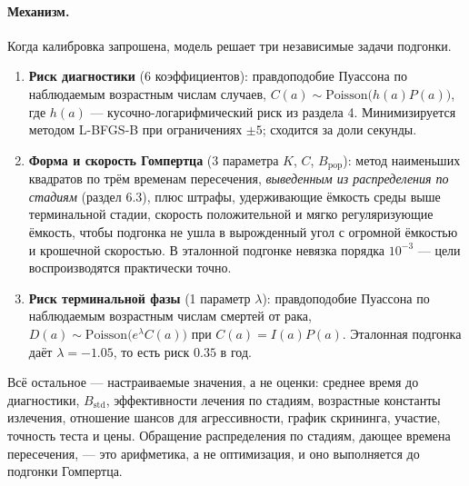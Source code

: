 \documentclass[12pt,a4paper]{article}
\newcommand{\mech}[1]{\paragraph{Механизм.} #1}
\begin{document}
\mech{Когда калибровка запрошена, модель решает три независимые задачи подгонки.

\begin{enumerate}[nosep]
  \item \textbf{Риск диагностики} (6 коэффициентов): правдоподобие Пуассона по наблюдаемым возрастным числам
        случаев, $C(a)\sim\mathrm{Poisson}\bigl(h(a)P(a)\bigr)$, где $h(a)$ --- кусочно-логарифмический риск
        из раздела 4. Минимизируется методом L-BFGS-B при ограничениях
        $\pm5$; сходится за доли секунды.
  \item \textbf{Форма и скорость Гомпертца} (3 параметра $K$, $C$, $B_{\text{pop}}$): метод наименьших
        квадратов по трём временам пересечения, \emph{выведенным из распределения по стадиям} (раздел 6.3),
        плюс штрафы, удерживающие ёмкость среды выше терминальной стадии, скорость положительной и мягко
        регуляризующие ёмкость, чтобы подгонка не ушла в вырожденный угол с огромной ёмкостью и крошечной
        скоростью. В эталонной подгонке невязка порядка $10^{-3}$ --- цели воспроизводятся практически точно.
  \item \textbf{Риск терминальной фазы} (1 параметр $\lambda$): правдоподобие Пуассона по наблюдаемым
        возрастным числам смертей от рака, $D(a)\sim\mathrm{Poisson}\bigl(e^{\lambda}C(a)\bigr)$ при
        $C(a)=I(a)P(a)$. Эталонная подгонка даёт $\lambda=-1.05$, то есть риск $0.35$ в год.
\end{enumerate}

Всё остальное --- настраиваемые значения, а не оценки: среднее время до диагностики, $B_{\text{std}}$,
эффективности лечения по стадиям, возрастные константы излечения, отношение шансов для агрессивности,
график скрининга, участие, точность теста и цены. Обращение распределения по стадиям, дающее времена
пересечения, --- это арифметика, а не оптимизация, и оно выполняется до подгонки Гомпертца.}
\end{document}
